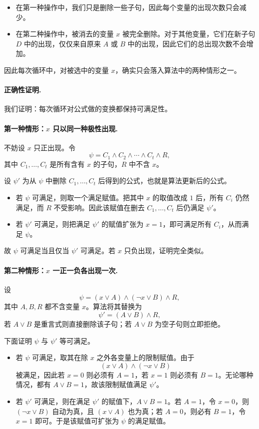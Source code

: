 \begin{answerred}
\begin{itemize}
  \item 在第一种操作中，我们只是删除一些子句，因此每个变量的出现次数只会减少。
  \item 在第二种操作中，被消去的变量 $x$ 被完全删除。对于其他变量，它们在新子句 $D$ 中的出现，仅仅来自原来 $A$ 或 $B$ 中的出现，因此它们的总出现次数不会增加。
\end{itemize}

因此每次循环中，对被选中的变量 $x$，确实只会落入算法中的两种情形之一。

\paragraph{正确性证明.}
我们证明：每次循环对公式做的变换都保持可满足性。

\paragraph{第一种情形：$x$ 只以同一种极性出现.}
不妨设 $x$ 只正出现。令
\[
\psi = C_1 \wedge C_2 \wedge \cdots \wedge C_t \wedge R,
\]
其中 $C_1,\dots,C_t$ 是所有含有 $x$ 的子句，$R$ 中不含 $x$。

设 $\psi'$ 为从 $\psi$ 中删除 $C_1,\dots,C_t$ 后得到的公式，也就是算法更新后的公式。

\begin{itemize}
  \item 若 $\psi$ 可满足，则取一个满足赋值。把其中 $x$ 的取值改成 $1$ 后，所有 $C_i$ 仍然满足，而 $R$ 不受影响。因此该赋值在删去 $C_1,\dots,C_t$ 后仍满足 $\psi'$。
  \item 若 $\psi'$ 可满足，则把满足 $\psi'$ 的赋值扩张为 $x=1$，即可满足所有 $C_i$，从而满足 $\psi$。
\end{itemize}

故 $\psi$ 可满足当且仅当 $\psi'$ 可满足。若 $x$ 只负出现，证明完全类似。

\paragraph{第二种情形：$x$ 一正一负各出现一次.}
设
\[
\psi = (x \vee A)\wedge (\neg x \vee B)\wedge R,
\]
其中 $A,B,R$ 都不含变量 $x$。算法将其替换为
\[
\psi' = (A \vee B)\wedge R,
\]
若 $A \vee B$ 是重言式则直接删除该子句；若 $A \vee B$ 为空子句则立即拒绝。

下面证明 $\psi$ 与 $\psi'$ 等可满足。

\begin{itemize}
  \item 若 $\psi$ 可满足，取其在除 $x$ 之外各变量上的限制赋值。由于
  \[
  (x \vee A)\wedge (\neg x \vee B)
  \]
  被满足，因此若 $x=0$ 则必须有 $A=1$，若 $x=1$ 则必须有 $B=1$。无论哪种情况，都有 $A \vee B = 1$，故该限制赋值满足 $\psi'$。
  \item 若 $\psi'$ 可满足，则在满足 $\psi'$ 的赋值下，$A \vee B = 1$。若 $A=1$，令 $x=0$，则 $(\neg x \vee B)$ 自动为真，且 $(x \vee A)$ 也为真；若 $A=0$，则必有 $B=1$，令 $x=1$ 即可。于是该赋值可扩张为 $\psi$ 的满足赋值。
\end{itemize}


\end{answerred}
